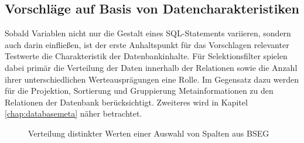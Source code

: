 \subsection{Vorschläge auf Basis von Datencharakteristiken}\label{chap:datacharacteristics}
Sobald Variablen nicht nur die Gestalt eines SQL-Statements variieren, sondern auch darin einfließen, ist der erste Anhaltspunkt für das Vorschlagen relevanter Testwerte die Charakteristik der Datenbankinhalte.
Für Selektionsfilter spielen dabei primär die Verteilung der Daten innerhalb der Relationen sowie die Anzahl ihrer unterschiedlichen Werteausprägungen eine Rolle.
Im Gegensatz dazu werden für die Projektion, Sortierung und Gruppierung Metainformationen zu den Relationen der Datenbank berücksichtigt.
Zweiteres wird in Kapitel \ref{chap:databasemeta} näher betrachtet.



\begin{figure}[ht]
\centering
	\caption{Verteilung distinkter Werten einer Auswahl von Spalten aus BSEG}
	\label{fig:bseg}
\end{figure}

